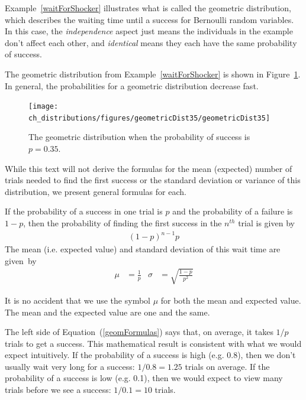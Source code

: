 Example~\ref{waitForShocker} illustrates what is called the geometric distribution, which describes the waiting time until a success for  Bernoulli random variables. In this case, the \emph{independence} aspect just means the individuals in the example don't affect each other, and \emph{identical} means they each have the same probability of success.

The geometric distribution from Example~\ref{waitForShocker} is shown in Figure~\ref{geometricDist35}. In general, the probabilities for a geometric distribution decrease  fast.

\begin{figure}
\centering
\texttt{[image: ch\_distributions/figures/geometricDist35/geometricDist35]}
\caption{The geometric distribution when the probability of success is $p=0.35$.}
\label{geometricDist35}
\end{figure}

While this text will not derive the formulas for the mean (expected) number of trials needed to find the first success or the standard deviation or variance of this distribution, we present general formulas for each.

\begin{termBox}{
If the probability of a success in one trial is $p$ and the probability of a failure is $1-p$, then the probability of finding the first success in the $n^{th}$ trial is given by\vspace{-1.5mm}
\begin{eqnarray}
(1-p)^{n-1}p
\end{eqnarray}
The mean (i.e. expected value) and standard deviation of this wait time are \mbox{given by}\vspace{-2.5mm}
\begin{align}
\mu &= \frac{1}{p}
	&\sigma &= \sqrt{\frac{1-p}{p^2}}
\label{geomFormulas}
\end{align}}
\end{termBox}

It is no accident that we use the symbol $\mu$ for both the mean and expected value. The mean and the expected value are one and the same.

The left side of Equation~(\ref{geomFormulas}) says that, on average, it takes $1/p$ trials to get a success. This mathematical result is consistent with what we would expect intuitively. If the probability of a success is high (e.g. 0.8), then we don't usually wait very long for a success: $1/0.8 = 1.25$ trials on average. If the probability of a success is low (e.g. 0.1), then we would expect to view many trials before we see a success: $1/0.1 = 10$ trials.

